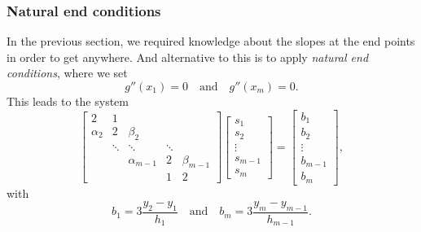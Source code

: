 \subsubsection{Natural end conditions}
In the previous section, we required knowledge about the slopes at the end points in order to get anywhere.
And alternative to this is to apply \textit{natural end conditions}, where we set
\begin{equation}
    g''(x_1) = 0
    \quad\text{and}\quad
    g''(x_m) = 0.
\end{equation}
This leads to the system
\begin{equation}
    \begin{bmatrix}
        2 & 1 \\
        \alpha_2 & 2 & \beta_2 \\
        & \ddots & \ddots & \ddots \\
        && \alpha_{m-1} & 2 & \beta_{m - 1} \\
        &&& 1 & 2
    \end{bmatrix}
    \begin{bmatrix}
        s_1 \\ s_2 \\ \vdots \\ s_{m - 1} \\ s_m
    \end{bmatrix}
    =
    \begin{bmatrix}
        b_1 \\ b_2 \\ \vdots \\ b_{m - 1} \\ b_m
    \end{bmatrix},
\end{equation}
with
\begin{equation}
    b_{1} = 3\frac{y_2 - y_1}{h_1}
    \quad\text{and}\quad
    b_m = 3 \frac{y_m - y_{m - 1}}{h_{m - 1}}.
\end{equation}